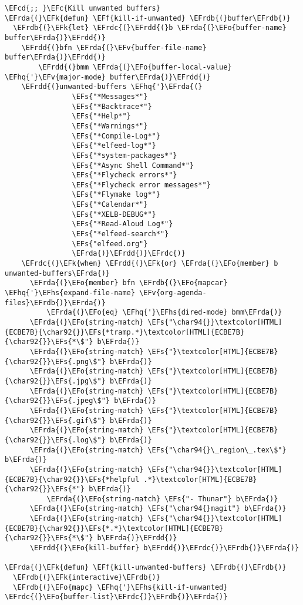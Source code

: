 \documentclass[a4wide,10pt]{article}
\newcommand{\EFc}[1]{\textcolor{EFc}{#1}} %
\newcommand{\EFcd}[1]{\textcolor{EFcd}{#1}} %
\newcommand{\EFs}[1]{\textcolor{EFs}{#1}} %
\newcommand{\EFk}[1]{\textcolor{EFk}{#1}} %
\newcommand{\EFf}[1]{\textcolor{EFf}{#1}} %
\newcommand{\EFv}[1]{\textcolor{EFv}{#1}} %
\newcommand{\EFo}[1]{\textcolor{EFo}{#1}} %
\newcommand{\EFhq}[1]{\textcolor{EFhq}{#1}} %
\newcommand{\EFhs}[1]{\textcolor{EFhs}{#1}} %
\newcommand{\EFrda}[1]{\textcolor{EFrda}{#1}} %
\newcommand{\EFrdb}[1]{\textcolor{EFrdb}{#1}} %
\newcommand{\EFrdc}[1]{\textcolor{EFrdc}{#1}} %
\newcommand{\EFrdd}[1]{\textcolor{EFrdd}{#1}} %
\begin{document}
\begin{Code}
\begin{Verbatim}
\EFcd{;; }\EFc{Kill unwanted buffers}
\EFrda{(}\EFk{defun} \EFf{kill-if-unwanted} \EFrdb{(}buffer\EFrdb{)}
  \EFrdb{(}\EFk{let} \EFrdc{(}\EFrdd{(}b \EFrda{(}\EFo{buffer-name} buffer\EFrda{)}\EFrdd{)}
	\EFrdd{(}bfn \EFrda{(}\EFv{buffer-file-name} buffer\EFrda{)}\EFrdd{)}
        \EFrdd{(}bmm \EFrda{(}\EFo{buffer-local-value} \EFhq{'}\EFv{major-mode} buffer\EFrda{)}\EFrdd{)}
	\EFrdd{(}unwanted-buffers \EFhq{'}\EFrda{(}
			    \EFs{"*Messages*"}
			    \EFs{"*Backtrace*"}
			    \EFs{"*Help*"}
			    \EFs{"*Warnings*"}
			    \EFs{"*Compile-Log*"}
			    \EFs{"*elfeed-log*"}
			    \EFs{"*system-packages*"}
			    \EFs{"*Async Shell Command*"}
			    \EFs{"*Flycheck errors*"}
			    \EFs{"*Flycheck error messages*"}
			    \EFs{"*Flymake log*"}
			    \EFs{"*Calendar*"}
			    \EFs{"*XELB-DEBUG*"}
			    \EFs{"*Read-Aloud Log*"}
			    \EFs{"*elfeed-search*"}
			    \EFs{"elfeed.org"}
			    \EFrda{)}\EFrdd{)}\EFrdc{)}
    \EFrdc{(}\EFk{when} \EFrdd{(}\EFk{or} \EFrda{(}\EFo{member} b unwanted-buffers\EFrda{)}
	  \EFrda{(}\EFo{member} bfn \EFrdb{(}\EFo{mapcar} \EFhq{'}\EFhs{expand-file-name} \EFv{org-agenda-files}\EFrdb{)}\EFrda{)}
          \EFrda{(}\EFo{eq} \EFhq{'}\EFhs{dired-mode} bmm\EFrda{)}
	  \EFrda{(}\EFo{string-match} \EFs{"\char94{}}\textcolor[HTML]{ECBE7B}{\char92{}}\EFs{*tramp.*}\textcolor[HTML]{ECBE7B}{\char92{}}\EFs{*\$"} b\EFrda{)}
	  \EFrda{(}\EFo{string-match} \EFs{"}\textcolor[HTML]{ECBE7B}{\char92{}}\EFs{.png\$"} b\EFrda{)}
	  \EFrda{(}\EFo{string-match} \EFs{"}\textcolor[HTML]{ECBE7B}{\char92{}}\EFs{.jpg\$"} b\EFrda{)}
	  \EFrda{(}\EFo{string-match} \EFs{"}\textcolor[HTML]{ECBE7B}{\char92{}}\EFs{.jpeg\$"} b\EFrda{)}
	  \EFrda{(}\EFo{string-match} \EFs{"}\textcolor[HTML]{ECBE7B}{\char92{}}\EFs{.gif\$"} b\EFrda{)}
	  \EFrda{(}\EFo{string-match} \EFs{"}\textcolor[HTML]{ECBE7B}{\char92{}}\EFs{.log\$"} b\EFrda{)}
	  \EFrda{(}\EFo{string-match} \EFs{"\char94{}\_region\_.tex\$"} b\EFrda{)}
	  \EFrda{(}\EFo{string-match} \EFs{"\char94{}}\textcolor[HTML]{ECBE7B}{\char92{}}\EFs{*helpful .*}\textcolor[HTML]{ECBE7B}{\char92{}}\EFs{*"} b\EFrda{)}
          \EFrda{(}\EFo{string-match} \EFs{"- Thunar"} b\EFrda{)}
	  \EFrda{(}\EFo{string-match} \EFs{"\char94{}magit"} b\EFrda{)}
	  \EFrda{(}\EFo{string-match} \EFs{"\char94{}}\textcolor[HTML]{ECBE7B}{\char92{}}\EFs{*.*}\textcolor[HTML]{ECBE7B}{\char92{}}\EFs{*\$"} b\EFrda{)}\EFrdd{)}
      \EFrdd{(}\EFo{kill-buffer} b\EFrdd{)}\EFrdc{)}\EFrdb{)}\EFrda{)}

\EFrda{(}\EFk{defun} \EFf{kill-unwanted-buffers} \EFrdb{(}\EFrdb{)}
  \EFrdb{(}\EFk{interactive}\EFrdb{)}
  \EFrdb{(}\EFo{mapc} \EFhq{'}\EFhs{kill-if-unwanted} \EFrdc{(}\EFo{buffer-list}\EFrdc{)}\EFrdb{)}\EFrda{)}


\end{Verbatim}
\end{Code}
\end{document}
